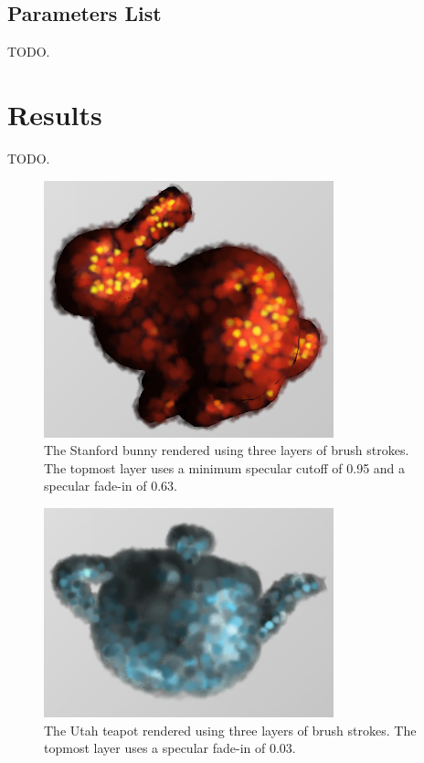 \documentclass[conference]{acmsiggraph}
\begin{document}
\subsection{Parameters List}

TODO.


\section{Results}

TODO.

\begin{figure}[ht]
  \centering
  \includegraphics[width=3.3in]{images/bunny_with_fade_in}
  \caption{The Stanford bunny rendered using three layers of brush strokes.
           The topmost layer uses a minimum specular cutoff of 0.95 and a
           specular fade-in of 0.63.}
\end{figure}

\begin{figure}[ht]
  \centering
  \includegraphics[width=3.3in]{images/teapot_with_background}
  \caption{The Utah teapot rendered using three layers of brush strokes.
           The topmost layer uses a specular fade-in of 0.03.}
\end{figure}
\end{document}
